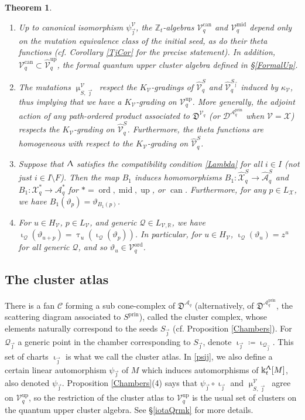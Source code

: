 \documentclass{amsart}
\DeclareMathOperator{\prin}{prin}
\DeclareMathOperator{\up}{up}
\DeclareMathOperator{\midd}{mid}
\DeclareMathOperator{\ord}{ord}
\DeclareMathOperator{\can}{can}
\let\bb=\mathbb
\let\rar=\rightarrow
\let\f=\mathfrak
\let\s=\mathcal
\let\wh=\widehat
\newcommand {\kk} {\Bbbk}
\newcommand {\sQ} {\mathcal{Q}}
\newcommand {\jj} {\vec{\jmath}}
\renewcommand{\iota}{\upiota}
\renewcommand{\Lambda}{\Uplambda}
\renewcommand{\tau}{\uptau}
\renewcommand{\mu}{\upmu}
\theoremstyle{plain}%
\newtheorem{thm}{Theorem}[section]
\newcommand{\Z}{{\mathbb Z}}
\theoremstyle{definition}
\theoremstyle{remark}
\begin{document}
\begin{thm}
\begin{enumerate}
    \item Up to canonical isomorphism $\psi_{\jj}^{\s{V}}$, the $\Z_t$-algebras $\s{V}_q^{\can}$ and $\s{V}_q^{\midd}$ depend only on the mutation equivalence class of the initial seed, as do their theta functions (cf. Corollary \ref{TjCor} for the precise statement).  In addition, $\s{V}_q^{\can} \subset \wh{\s{V}}_q^{\up}$, the formal quantum upper cluster algebra defined in \S \ref{FormalUp}. 
    \item  The mutations $\mu_{S,\jj}^{\s{V}}$ respect the $K_{\s{V}}$-gradings of $\wh{\s{V}}_q^S$ and $\wh{\s{V}}_q^{S_{\jj}}$ induced by $\kappa_{\s{V}}$, thus implying that we have a $K_{\s{V}}$-grading on $\s{V}_q^{\up}$.
    More generally, the adjoint action of any path-ordered product associated to $\f{D}^{\s{V}_q}$ (or $\s{D}^{\s{A}_q^{\prin}}$ when $\s{V}=\s{X}$) respects the $K_{\s{V}}$-grading on $\wh{\s{V}}_q^S$.  Furthermore, the theta functions are homogeneous with respect to the $K_{\s{V}}$-grading on $\wh{\s{V}}_q^S$.  
\item Suppose that $\Lambda$ satisfies the compatibility condition \eqref{Lambda} for all $i\in I$ (not just $i\in I\setminus F$).  Then the map $B_1$ induces homomorphisms $B_1\colon \wh{\s{X}}_q^S\rar \wh{\s{A}}_q^S$ and $B_1\colon \s{X}_q^*\rar \s{A}_q^*$ for $*=\ord, \midd, \up$, or $\can$.  
Furthermore, for any $p\in L_{\s{X}}$, we have $B_1(\vartheta_p)=\vartheta_{B_1(p)}$. 
\item For $u\in H_{\s{V}}$, $p\in L_{\s{V}}$, and generic $\sQ \in L_{\s{V},\bb{R}}$, we have $\iota_{\sQ}(\vartheta_{u+p})=\tau_u(\iota_{\sQ}(\vartheta_p))$. In particular, for $u\in H_{\s{V}}$, $\iota_{\sQ}(\vartheta_u)=z^u$  for all generic $\sQ$, and so $\vartheta_u\in \s{V}^{\ord}_q$.  
\end{enumerate}
\end{thm}


\subsection{The cluster atlas}\label{cluster_atlas}

There is a fan $\s{C}$ forming a sub cone-complex of $\f{D}^{\s{A}_q}$ (alternatively, of $\f{D}^{\s{A}_q^{\prin}}$, the scattering diagram associated to $S^{\prin}$), called the cluster complex, whose elements naturally correspond to the seeds $S_{\jj}$ (cf. Proposition \ref{Chambers}).  For $\sQ_{\jj}$ a generic point in the chamber corresponding to $S_{\jj}$, denote $\iota_{\jj}\coloneqq \iota_{\sQ_{\jj}}$. This set of charts $\iota_{\jj}$ is what we call the cluster atlas.  In \eqref{psij}, we also define a certain linear automorphism $\psi_{\jj}$ of $M$ which induces automorphisms of $\kk_t^{\Lambda}[M]$, also denoted $\psi_{\jj}$.  Proposition \ref{Chambers}(4) says that $\psi_{\jj}\circ \iota_{\jj}$ and $\mu^{\s{V}}_{S,\jj}$ agree on $\s{V}_q^{\up}$, so the restriction of the cluster atlas to $\s{V}_q^{\up}$ is the usual set of clusters on the quantum upper cluster algebra.  See \S \ref{iotaQrmk} for more details. 
\end{document}
